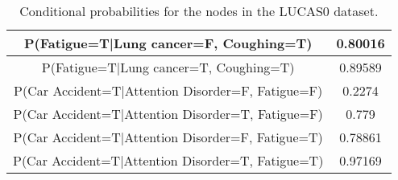 \documentclass{article}
\begin{document}
\begin{table}[h]
\begin{tabular}{|c|c|}
        P(Fatigue=T|Lung cancer=F, Coughing=T) & 0.80016 \\ \hline
        P(Fatigue=T|Lung cancer=T, Coughing=T) & 0.89589 \\ \hline
        P(Car Accident=T|Attention Disorder=F, Fatigue=F) & 0.2274 \\ \hline
        P(Car Accident=T|Attention Disorder=T, Fatigue=F) & 0.779 \\ \hline
        P(Car Accident=T|Attention Disorder=F, Fatigue=T) & 0.78861 \\ \hline
        P(Car Accident=T|Attention Disorder=T, Fatigue=T) & 0.97169 \\ \hline
        \hline
    \end{tabular}
    \caption{Conditional probabilities for the nodes in the LUCAS0 dataset.}
    \label{tab:lucas_probs}
\end{table}
\end{document}
